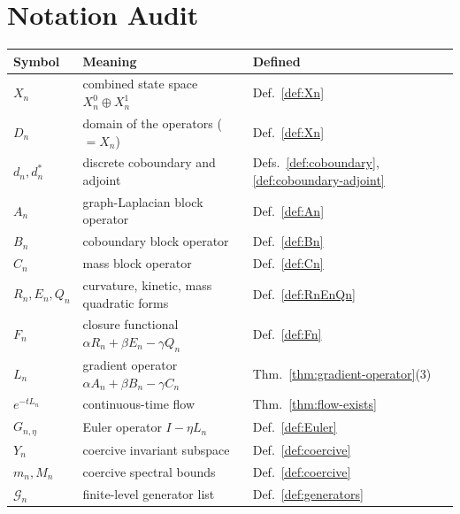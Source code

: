 \documentclass[11pt, a4paper]{amsart}
\theoremstyle{definition}
\begin{document}
\section{Notation Audit}
\label{app:notation}

\begin{center}
\begin{tabular}{lll}
\hline
Symbol & Meaning & Defined \\
\hline
$X_n$ & combined state space $X_n^0 \oplus X_n^1$ & Def.~\ref{def:Xn} \\
$D_n$ & domain of the operators ($= X_n$) & Def.~\ref{def:Xn} \\
$d_n, d_n^*$ & discrete coboundary and adjoint & Defs.~\ref{def:coboundary}, \ref{def:coboundary-adjoint} \\
$A_n$ & graph-Laplacian block operator & Def.~\ref{def:An} \\
$B_n$ & coboundary block operator & Def.~\ref{def:Bn} \\
$C_n$ & mass block operator & Def.~\ref{def:Cn} \\
$R_n, E_n, Q_n$ & curvature, kinetic, mass quadratic forms & Def.~\ref{def:RnEnQn} \\
$F_n$ & closure functional $\alpha R_n + \beta E_n - \gamma Q_n$ & Def.~\ref{def:Fn} \\
$L_n$ & gradient operator $\alpha A_n + \beta B_n - \gamma C_n$ & Thm.~\ref{thm:gradient-operator}(3) \\
$e^{-t L_n}$ & continuous-time flow & Thm.~\ref{thm:flow-exists} \\
$G_{n, \eta}$ & Euler operator $I - \eta L_n$ & Def.~\ref{def:Euler} \\
$Y_n$ & coercive invariant subspace & Def.~\ref{def:coercive} \\
$m_n, M_n$ & coercive spectral bounds & Def.~\ref{def:coercive} \\
$\mathcal{G}_n$ & finite-level generator list & Def.~\ref{def:generators} \\
\hline
\end{tabular}
\end{center}
\end{document}
